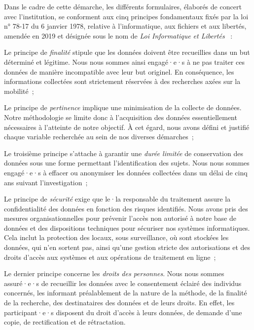 \begin{refsegment}
Dans le cadre de cette démarche, les différents formulaires, élaborés de concert avec l'institution, se conforment aux cinq principes fondamentaux fixés par la loi n° 78-17 du 6 janvier 1978, relative à l'informatique, aux fichiers et aux libertés, amendée en 2019 et désignée sous le nom de \textsl{Loi Informatique et Libertés} \textcolor{blue}{\autocite[16]{inshs_sciences_2021}}~:
\begin{customitemize}
    \item Le principe de \textsl{finalité} stipule que les données doivent être recueillies dans un but déterminé et légitime. Nous nous sommes ainsi engagé·e·s à ne pas traiter ces données de manière incompatible avec leur but originel. En conséquence, les informations collectées sont strictement réservées à des recherches axées sur la mobilité~;
    \item Le principe de \textsl{pertinence} implique une minimisation de la collecte de données. Notre méthodologie se limite donc à l'acquisition des données essentiellement nécessaires à l'atteinte de notre objectif. À cet égard, nous avons défini et justifié chaque variable recherchée au sein de nos diverses démarches~;
    \item Le troisième principe s'attache à garantir une \textsl{durée limitée} de conservation des données sous une forme permettant l'identification des sujets. Nous nous sommes engagé·e·s à effacer ou anonymiser les données collectées dans un délai de cinq ans suivant l'investigation~;
    \item Le principe de \textsl{sécurité} exige que le·la responsable du traitement assure la confidentialité des données en fonction des risques identifiés. Nous avons pris des mesures organisationnelles pour prévenir l'accès non autorisé à notre base de données et des dispositions techniques pour sécuriser nos systèmes informatiques. Cela inclut la protection des locaux, sous surveillance, où sont stockées les données, qui n'en sortent pas, ainsi qu'une gestion stricte des autorisations et des droits d'accès aux systèmes et aux opérations de traitement en ligne~;
    \item Le dernier principe concerne les \textsl{droits des personnes}. Nous nous sommes assuré·e·s de recueillir les données avec le consentement éclairé des individus concernés, les informant préalablement de la nature de la méthode, de la finalité de la recherche, des destinataires des données et de leurs droits. En effet, les participant·e·s disposent du droit d'accès à leurs données, de demande d'une copie, de rectification et de rétractation.
\end{customitemize}%


\end{refsegment}

